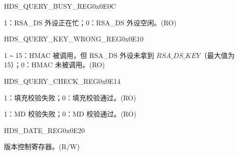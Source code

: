 \begin{register}{H}{DS\_QUERY\_BUSY\_REG}{0x0E0C}\label{regdesc:DSQUERYBUSYREG}
%
%
\regnewline%
\begin{regdesc}\begin{reglist}
\item [DS\_QUERY\_BUSY] 1：RSA\_DS 外设正在忙；0：RSA\_DS 外设空闲。(RO)
\end{reglist}\end{regdesc}
\end{register}



\begin{register}{H}{DS\_QUERY\_KEY\_WRONG\_REG}{0x0E10}\label{regdesc:DSQUERYKEYWRONGREG}
%
%
\regnewline%
\begin{regdesc}\begin{reglist}
\item [DS\_QUERY\_KEY\_WRONG] 1 \verb+~+ 15：HMAC 被调用，但 RSA\_DS 外设未拿到 \begin{math}RSA\_DS\_KEY\end{math}（最大值为 15）；0：HMAC 未被调用。(RO)
\end{reglist}\end{regdesc}
\end{register}




\begin{register}{H}{DS\_QUERY\_CHECK\_REG}{0x0E14}\label{regdesc:DSQUERYCHECKREG}
%
%
%
\regnewline%
\begin{regdesc}\begin{reglist}
\item [DS\_PADDING\_BAD] 1：填充校验失败；0：填充校验通过。(RO)
\item [DS\_MD\_ERROR] 1：MD 校验失败；0：MD 校验通过。(RO)
\end{reglist}\end{regdesc}
\end{register}




\begin{register}{H}{DS\_DATE\_REG}{0x0E20}\label{regdesc:DSDATEREG}
%
%
\regnewline%
\begin{regdesc}\begin{reglist}
\item [DS\_DATE] 版本控制寄存器。(R/W)
\end{reglist}\end{regdesc}
\end{register}
